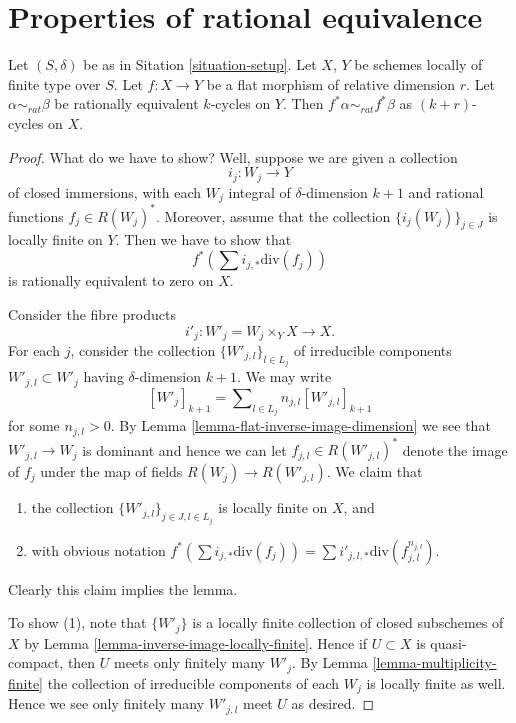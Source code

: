 \section{Properties of rational equivalence}
\label{section-properties-rational-equivalence}

\begin{lemma}
\label{lemma-flat-pullback-rational-equivalence}
Let $(S, \delta)$ be as in Sitation \ref{situation-setup}.
Let $X$, $Y$ be schemes locally of finite type over $S$.
Let $f : X \to Y$ be a flat morphism of relative dimension $r$.
Let $\alpha \sim_{rat} \beta$ be rationally equivalent $k$-cycles on $Y$.
Then $f^*\alpha \sim_{rat} f^*\beta$ as $(k + r)$-cycles on $X$.
\end{lemma}

\begin{proof}
What do we have to show? Well, suppose we are given a collection
$$
i_j : W_j \longrightarrow Y
$$
of closed immersions, with each $W_j$ integral of $\delta$-dimension $k + 1$
and rational functions $f_j \in R(W_j)^*$.
Moreover, assume that
the collection $\{i_j(W_j)\}_{j \in J}$ is locally finite on $Y$.
Then we have to show that
$$
f^*(\sum i_{j, *}\text{div}(f_j))
$$
is rationally equivalent to zero on $X$.

\medskip\noindent
Consider the fibre products
$$
i'_j : 
W'_j = W_j \times_Y X
\longrightarrow
X.
$$
For each $j$, consider the collection $\{W'_{j, l}\}_{l \in L_j}$
of irreducible components $W'_{j, l} \subset W'_j$ having $\delta$-dimension
$k + 1$. We may write
$$
[W'_j]_{k + 1} = \sum\nolimits_{l \in L_j} n_{j, l}[W'_{j, l}]_{k + 1}
$$
for some $n_{j, l} > 0$.
By Lemma \ref{lemma-flat-inverse-image-dimension}
we see that $W'_{j, l} \to W_j$ is
dominant and hence we can let $f_{j, l} \in R(W'_{j, l})^*$ denote the
image of $f_j$ under the map of fields $R(W_j) \to R(W'_{j, l})$.
We claim that
\begin{enumerate}
\item the collection $\{W'_{j, l}\}_{j \in J, l \in L_j}$ is
locally finite on $X$, and
\item with obvious notation
$f^*(\sum i_{j, *}\text{div}(f_j))
=
\sum i'_{j, l, *} \text{div}(f_{j, l}^{n_{j, l}})$.
\end{enumerate}
Clearly this claim implies the lemma.

\medskip\noindent
To show (1), note that $\{W'_j\}$ is a locally finite collection
of closed subschemes of $X$ by Lemma \ref{lemma-inverse-image-locally-finite}.
Hence if $U \subset X$ is quasi-compact, then $U$ meets only finitely
many $W'_j$. By Lemma \ref{lemma-multiplicity-finite} the collection of
irreducible components of each $W_j$ is locally finite as well. Hence
we see only finitely many $W'_{j, l}$ meet $U$ as desired.


\end{proof}
